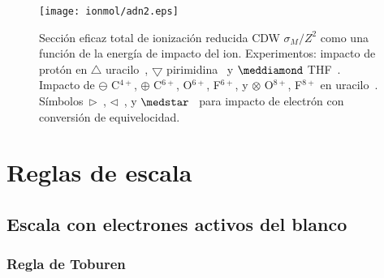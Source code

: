 \begin{figure}
\centering
\texttt{[image: ionmol/adn2.eps]}
\caption[Sección eficaz total de ionización reducida de moléculas (parte 2).]
{Sección eficaz total de ionización reducida CDW $\sigma_{M}/Z^2$ como una 
función de la energía de impacto del ion. Experimentos: impacto de protón
en $\triangle$ uracilo~\cite{itoh2013}, 
$\bigtriangledown$ pirimidina~\cite{wolff2014} y $\meddiamond$
THF~\cite{wang2016}. Impacto de $\ominus$ C$^{4+}$, $\oplus$ C$^{6+}$, 
O$^{6+}$, F$^{6+}$, y $\otimes$ O$^{8+}$, F$^{8+}$ en
uracilo~\cite{agnihotri2012,agnihotri2013}. 
Símbolos~$\rhd$~\cite{bug2017}, $\lhd$~\cite{wolf2019}, y 
$\medstar$~\cite{fuss2009} para impacto de electrón con conversión de 
equivelocidad.}
\label{fig:crossDNA_2}
\end{figure} 

\section{Reglas de escala}
\label{sec:scaling}

\subsection{Escala con electrones activos del blanco}
\label{subsec:ne_scaling}

\subsubsection{Regla de Toburen}
\label{subsec:toburen}

